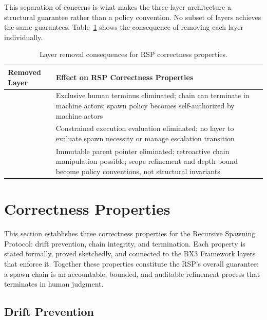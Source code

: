 This separation of concerns is what makes the three-layer architecture a structural guarantee rather than a policy convention. No subset of layers achieves the same guarantees. Table~\ref{tab:layer_removal} shows the consequence of removing each layer individually.

\begin{table}[htbp]
\begin{center}
\begin{tabular}{l|p{6cm}}
\toprule
\textbf{Removed Layer} & \textbf{Effect on RSP Correctness Properties} \\
\midrule
\purus{} & Exclusive human terminus eliminated; chain can terminate in machine actors; spawn policy becomes self-authorized by machine actors \\
\bounds{} & Constrained execution evaluation eliminated; no layer to evaluate spawn necessity or manage escalation transition \\
\fact{} & Immutable parent pointer eliminated; retroactive chain manipulation possible; scope refinement and depth bound become policy conventions, not structural invariants \\
\bottomrule
\end{tabular}
\caption{Layer removal consequences for RSP correctness properties.}
\label{tab:layer_removal}
\end{center}
\end{table}

\section{Correctness Properties}
\label{sec:correctness}

This section establishes three correctness properties for the Recursive Spawning Protocol: drift prevention, chain integrity, and termination. Each property is stated formally, proved sketchedly, and connected to the BX3 Framework layers that enforce it. Together these properties constitute the RSP's overall guarantee: a spawn chain is an accountable, bounded, and auditable refinement process that terminates in human judgment.

\subsection{Drift Prevention}
\label{sec:drift_prevention}

